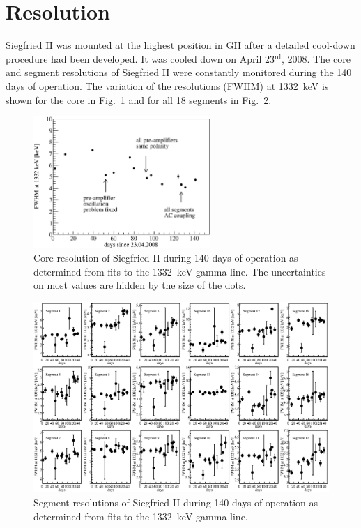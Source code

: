 \section{Resolution}
\label{sec:ii:sigma}
Siegfried II was mounted at the highest position in GII after a
detailed cool-down procedure had been developed. It was cooled down on
April 23$^{\text{rd}}$, 2008. The core and segment resolutions of
Siegfried II were constantly monitored during the 140 days of
operation. The variation of the resolutions (FWHM) at 1332~keV is
shown for the core in Fig.~\ref{fig:ii:fwhm_core} and for all 18
segments in Fig.~\ref{fig:ii:fwhm_segs}.
\begin{figure}[hbtp]
\centering
\includegraphics[width=0.6\textwidth]{fwhm_versus_time_core}
\caption{Core resolution of Siegfried II during 140 days of operation
as determined from fits to the 1332~keV gamma line. The uncertainties
on most values are hidden by the size of the dots.}
\label{fig:ii:fwhm_core}
\end{figure}

\begin{figure}
\centering
\includegraphics{fwhm_versus_time_segments}
\caption{Segment resolutions of Siegfried II during 140 days of
operation as determined from fits to the 1332~keV gamma line.}
\label{fig:ii:fwhm_segs}
\end{figure}

